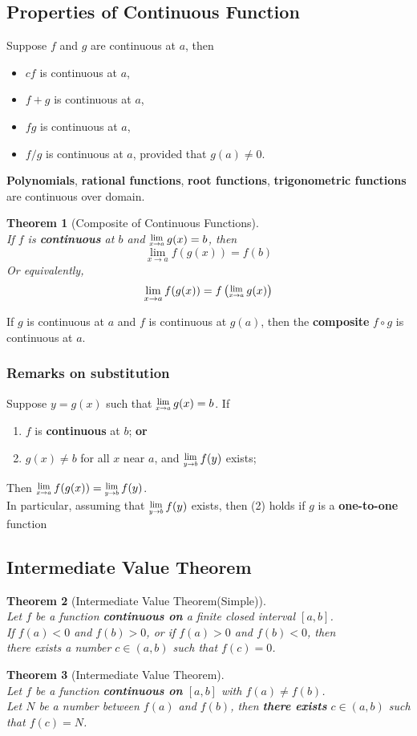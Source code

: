 \documentclass[12pt]{article}
\newcommand{\Lim}[1]{\raisebox{0.5ex}{\scalebox{0.8}{$\displaystyle \lim_{#1}\;$}}}
\newtheorem{theorem}{Theorem}[section]
\theoremstyle{definition}
\begin{document}
\subsection{Properties of Continuous Function}
Suppose $f$ and $g$ are continuous at $a$, then
\begin{itemize}
\item $cf$ is continuous at $a$,
\item $f+g$ is continuous at $a$,
\item $fg$ is continuous at $a$,
\item $f/g$ is continuous at $a$, provided that $g(a)\neq 0$.
\end{itemize}
\textbf{Polynomials}, \textbf{rational functions}, \textbf{root functions}, \textbf{trigonometric functions} are continuous over domain.
\begin{theorem}[Composite of Continuous Functions]
\hfill\\
\normalfont If $f$ is \textbf{continuous} at $b$ and $\Lim{x\to a}g(x)=b$, then
\[
\lim_{x\to a}f(g(x))=f(b)
\]
Or equivalently,
\[
\lim_{x\to a}f(g(x))=f\left(\Lim{x\to a}g(x)\right)
\]
\end{theorem}
If $g$ is continuous at $a$ and $f$ is continuous at $g(a)$, then the \textbf{composite} $f\circ g$ is continuous at $a$.
\subsubsection{Remarks on substitution}
Suppose $y=g(x)$ such that $\Lim{x\to a}g(x)=b$. If
\begin{enumerate}
\item $f$ is \textbf{continuous} at $b$; \textbf{or}
\item $g(x)\neq b$ for all $x$ near $a$, and $\Lim{y\to b}f(y)$ exists;
\end{enumerate}
Then $\Lim{x\to a}f(g(x))=\Lim{y\to b}f(y)$.\\
In particular, assuming that $\Lim{y\to b}f(y)$ exists, then (2) holds if $g$ is a \textbf{one-to-one} function
\subsection{Intermediate Value Theorem}
\begin{theorem}[Intermediate Value Theorem(Simple)]
\hfill\\
\normalfont Let $f$ be a function \textbf{continuous on} a finite closed interval $[a,b]$.\\
If $f(a)<0$ and $f(b)>0$, or if $f(a)>0$ and $f(b)<0$, then\\
there exists a number $c\in(a,b)$ such that $f(c)=0$.
\end{theorem}
\begin{theorem}[Intermediate Value Theorem]
\hfill\\
\normalfont Let $f$ be a function \textbf{continuous on}  $[a,b]$ with $f(a)\neq f(b)$.\\
Let $N$ be a number between $f(a)$ and $f(b)$, then \textbf{there exists} $c\in(a,b)$ such that $f(c)=N$.
\end{theorem}
\clearpage 
\end{document}
